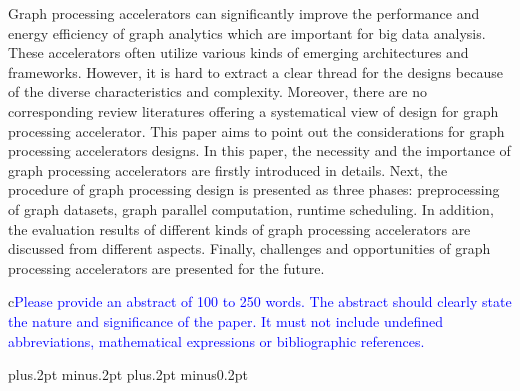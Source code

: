 \documentclass[twoside]{article}
\begin{document}
\begin{CJK*}{GBK}{song}
 \quad  Graph processing accelerators can significantly improve the performance and energy efficiency of graph analytics which are important for big data analysis. These accelerators often utilize various kinds of emerging architectures and frameworks. However, it is hard to extract a clear thread for the designs because of the diverse characteristics and complexity. Moreover, there are no corresponding review literatures offering a systematical view of design for graph processing accelerator. This paper aims to point out the considerations for graph processing accelerators designs. In this paper, the necessity and the importance of graph processing accelerators are firstly introduced in details. Next, the procedure of graph processing design is presented as three phases: preprocessing of graph datasets, graph parallel computation, runtime scheduling. In addition, the evaluation results of different kinds of graph processing accelerators are discussed from different aspects. Finally, challenges and opportunities of graph processing accelerators are presented for the future. 

c{\small \textcolor{blue}{Please provide an abstract of 100 to 250 words. The abstract should clearly state the nature and significance of the paper. It must not include undefined abbreviations, mathematical expressions or bibliographic references.}}

\vspace*{3mm}

 

\vspace*{4mm}

\end{CJK*}
\baselineskip=13.2pt plus.2pt minus.2pt
\parskip=0pt plus.2pt minus0.2pt
\end{document}
